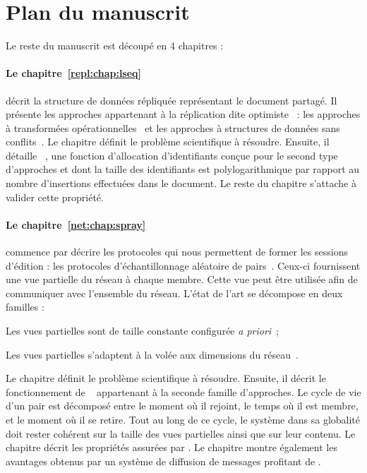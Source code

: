 
\section{Plan du manuscrit}

Le reste du manuscrit est découpé en 4 chapitres :

\paragraph{Le chapitre~\ref{repl:chap:lseq}} décrit la structure de données
répliquée représentant le document partagé. Il présente les approches
appartenant à la réplication dite optimiste~\cite{demers1987epidemic,
  saito2005optimistic} : les approches à transformées
opérationnelles~\cite{sun1998achieving, sun2009contextbased} et les approches à
structures de données sans conflits~\cite{burckhardt2014replicated,
  shapiro2011conflict}. Le chapitre définit le problème scientifique à
résoudre. Ensuite, il détaille \LSEQ~\cite{nedelec2013concurrency,
  nedelec2013lseq}, une fonction d'allocation d'identifiants conçue pour le
second type d'approches et dont la taille des identifiants est polylogarithmique
par rapport au nombre d'insertions effectuées dans le document. Le reste du
chapitre s'attache à valider cette propriété.

\paragraph{Le chapitre~\ref{net:chap:spray}} commence par décrire les protocoles
qui nous permettent de former les sessions d'édition : les protocoles
d'échantillonnage aléatoire de pairs~\cite{jelasity2004peer,
  jelasity2007gossip}. Ceux-ci fournissent une vue partielle du réseau à chaque
membre. Cette vue peut être utilisée afin de communiquer avec l'ensemble du
réseau. L'état de l'art se décompose en deux familles :
\begin{inparaenum}[(i)]
\item Les vues partielles sont de taille constante configurée \emph{a
    priori}~\cite{eugster2003lightweight, jelasity2007gossip,
    leitao2007dependable, tolgyeski2009adaptive, voulgaris2005cyclon};
\item Les vues partielles s'adaptent à la volée aux dimensions du
  réseau~\cite{ganesh2001scamp, ganesh2003peer}.
\end{inparaenum}
Le chapitre définit le problème scientifique à résoudre. Ensuite, il décrit le
fonctionnement de \SPRAY~\cite{nedelec2015spray} appartenant à la seconde
famille d'approches. Le cycle de vie d'un pair est décomposé entre le moment où
il rejoint, le temps où il est membre, et le moment où il se retire. Tout au
long de ce cycle, le système dans sa globalité doit rester cohérent sur la
taille des vues partielles ainsi que sur leur contenu.  Le chapitre décrit les
propriétés assurées par \SPRAY. Le chapitre montre également les avantages
obtenus par un système de diffusion de messages profitant de \SPRAY.

